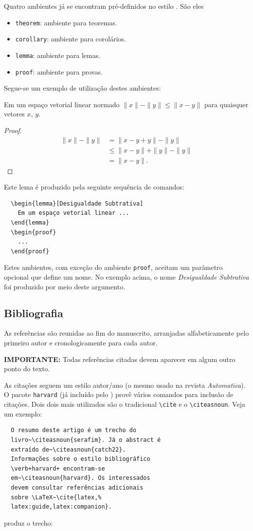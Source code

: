 \documentclass[conference,harvard,brazil,english]{sbatex}
\begin{document}
Quatro ambientes já se encontram pré-definidos no estilo \SBATeX. São
eles
\begin{itemize}
\item \verb+theorem+: ambiente para teoremas.
\item \verb+corollary+: ambiente para corolários.
\item \verb+lemma+: ambiente para lemas.
\item \verb+proof+: ambiente para provas.
\end{itemize}
Segue-se um exemplo de utilização destes ambientes:
\begin{lemma}
Em um espaço vetorial linear normado $\|x\| - \|y\| \leq \|x - y\|$
para quaisquer vetores $x$, $y$.
\end{lemma}
\begin{proof}
\begin{align*}
\|x\| - \|y\| &= \|x - y + y\| - \|y\| \ \\
              &\leq \|x - y \| + \|y\| - \|y\| \\
              &= \|x - y\|.
\end{align*}
\end{proof}
Este lema é produzido pela seguinte sequência de comandos:
\begin{verbatim}
  \begin{lemma}[Desigualdade Subtrativa]
    Em um espaço vetorial linear ...
  \end{lemma}
  \begin{proof}
    ...
  \end{proof}
\end{verbatim}

Estes ambientes, com exceção do ambiente \verb+proof+, aceitam
um parâmetro opcional que define um nome. No exemplo acima, o nome
\emph{Desigualdade Subtrativa} foi produzido por meio deste argumento.


\subsection{Bibliografia}
\label{sec:bibliografia}

As referências são reunidas ao fim do manuscrito, arranjadas
alfabeticamente pelo primeiro autor e cronologicamente para cada
autor.

\textbf{IMPORTANTE:} Todas referências citadas devem aparecer em algum
outro ponto do texto.

As citações seguem um estilo autor/ano (o mesmo
usado na revista {\em Automatica}). O pacote \verb+harvard+ (já
incluído pelo \SBATeX) provê vários comandos para inclusão de
citações. Dois dois mais utilizados são o tradicional \verb+\cite+ e o
\verb+\citeasnoun+. Veja um exemplo:
\begin{verbatim}
  O resumo deste artigo é um trecho do
  livro~\citeasnoun{serafim}. Já o abstract é
  extraído de~\citeasnoun{catch22}.
  Informações sobre o estilo bibliográfico
  \verb+harvard+ encontram-se
  em~\citeasnoun{harvard}. Os interessados
  devem consultar referências adicionais
  sobre \LaTeX~\cite{latex,%
  latex:guide,latex:companion}.
\end{verbatim}
produz o trecho:
\end{document}
